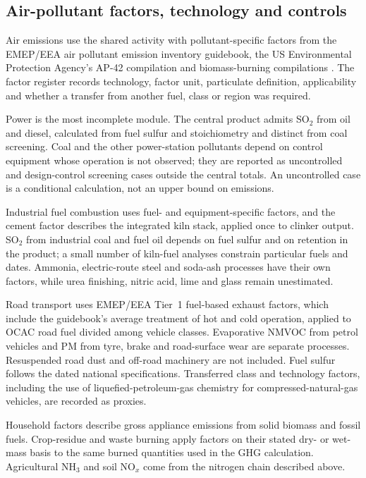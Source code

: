 \documentclass[essd,manuscript]{copernicus}
\begin{document}
\subsection{Air-pollutant factors, technology and controls}
Air emissions use the shared activity with pollutant-specific factors from the EMEP/EEA air pollutant emission inventory guidebook, the US Environmental Protection Agency's AP-42 compilation and biomass-burning compilations \citep{EMEPEEA2023,AP42,Andreae2019}. The factor register records technology, factor unit, particulate definition, applicability and whether a transfer from another fuel, class or region was required.

Power is the most incomplete module. The central product admits SO$_2$ from oil and diesel, calculated from fuel sulfur and stoichiometry and distinct from coal screening. Coal and the other power-station pollutants depend on control equipment whose operation is not observed; they are reported as uncontrolled and design-control screening cases outside the central totals. An uncontrolled case is a conditional calculation, not an upper bound on emissions.

Industrial fuel combustion uses fuel- and equipment-specific factors, and the cement factor describes the integrated kiln stack, applied once to clinker output. SO$_2$ from industrial coal and fuel oil depends on fuel sulfur and on retention in the product; a small number of kiln-fuel analyses constrain particular fuels and dates. Ammonia, electric-route steel and soda-ash processes have their own factors, while urea finishing, nitric acid, lime and glass remain unestimated.

Road transport uses EMEP/EEA Tier~1 fuel-based exhaust factors, which include the guidebook's average treatment of hot and cold operation, applied to OCAC road fuel divided among vehicle classes. Evaporative NMVOC from petrol vehicles and PM from tyre, brake and road-surface wear are separate processes. Resuspended road dust and off-road machinery are not included. Fuel sulfur follows the dated national specifications. Transferred class and technology factors, including the use of liquefied-petroleum-gas chemistry for compressed-natural-gas vehicles, are recorded as proxies.

Household factors describe gross appliance emissions from solid biomass and fossil fuels. Crop-residue and waste burning apply factors on their stated dry- or wet-mass basis to the same burned quantities used in the GHG calculation. Agricultural NH$_3$ and soil NO$_x$ come from the nitrogen chain described above.
\end{document}
